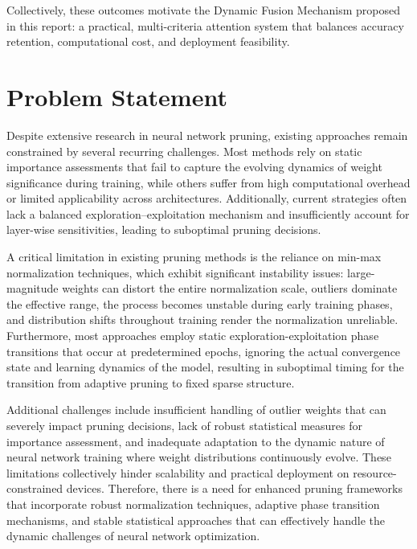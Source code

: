 \documentclass[12pt,a4paper]{report}
\begin{document}
Collectively, these outcomes motivate the Dynamic Fusion Mechanism proposed in this report: a practical, multi-criteria attention system that balances accuracy retention, computational cost, and deployment feasibility.

\clearpage

\chapter{Problem Statement}
Despite extensive research in neural network pruning, existing approaches remain constrained by several recurring challenges. Most methods rely on static importance assessments that fail to capture the evolving dynamics of weight significance during training, while others suffer from high computational overhead or limited applicability across architectures. Additionally, current strategies often lack a balanced exploration–exploitation mechanism and insufficiently account for layer-wise sensitivities, leading to suboptimal pruning decisions. 

A critical limitation in existing pruning methods is the reliance on min-max normalization techniques, which exhibit significant instability issues: large-magnitude weights can distort the entire normalization scale, outliers dominate the effective range, the process becomes unstable during early training phases, and distribution shifts throughout training render the normalization unreliable. Furthermore, most approaches employ static exploration-exploitation phase transitions that occur at predetermined epochs, ignoring the actual convergence state and learning dynamics of the model, resulting in suboptimal timing for the transition from adaptive pruning to fixed sparse structure.

Additional challenges include insufficient handling of outlier weights that can severely impact pruning decisions, lack of robust statistical measures for importance assessment, and inadequate adaptation to the dynamic nature of neural network training where weight distributions continuously evolve. These limitations collectively hinder scalability and practical deployment on resource-constrained devices. Therefore, there is a need for enhanced pruning frameworks that incorporate robust normalization techniques, adaptive phase transition mechanisms, and stable statistical approaches that can effectively handle the dynamic challenges of neural network optimization.

\clearpage
\end{document}

